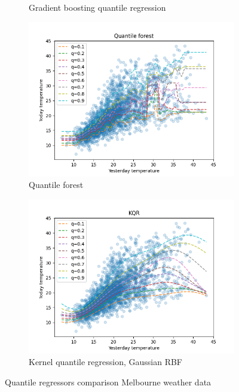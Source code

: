 \begin{figure}[!h]
\begin{subfigure}[b]{0.5\linewidth}
      \caption{Gradient boosting quantile regression} 
      \label{fig:melbourne_gradient_boosting_quantile_regression} 
      \vspace{4ex}
    \end{subfigure} 
    \begin{subfigure}[b]{0.5\linewidth}
      \centering
      \includegraphics[width=1.1\textwidth]{images/melbourne_quantile_forest.png} 
      \caption{Quantile forest} 
      \label{fig:melbourne_quantile_forest} 
    \end{subfigure}%
    \begin{subfigure}[b]{0.5\linewidth}
      \centering
      \includegraphics[width=1.1\textwidth]{images/melbourne_kernel_quantile_regression.png}
      \caption{Kernel quantile regression, Gaussian RBF} 
      \label{fig:melborune_kernel_quantile_regression} 
    \end{subfigure} 
    \caption{Quantile regressors comparison Melbourne weather data}
    \label{fig:melbourne_quantiles_comparison} 
  \end{figure}

